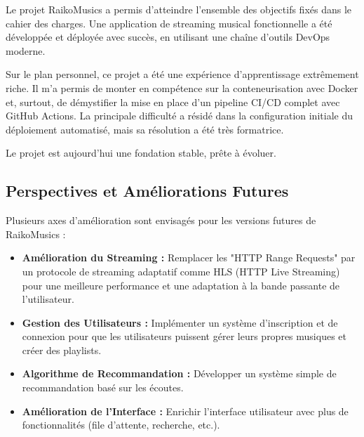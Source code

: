 \documentclass[12pt,a4paper]{article} %
\begin{document}
Le projet RaikoMusics a permis d'atteindre l'ensemble des objectifs fixés dans le cahier des charges. Une application de streaming musical fonctionnelle a été développée et déployée avec succès, en utilisant une chaîne d'outils DevOps moderne.

Sur le plan personnel, ce projet a été une expérience d'apprentissage extrêmement riche. Il m'a permis de monter en compétence sur la conteneurisation avec Docker et, surtout, de démystifier la mise en place d'un pipeline CI/CD complet avec GitHub Actions. La principale difficulté a résidé dans la configuration initiale du déploiement automatisé, mais sa résolution a été très formatrice.

Le projet est aujourd'hui une fondation stable, prête à évoluer.

\subsection{Perspectives et Améliorations Futures}
Plusieurs axes d'amélioration sont envisagés pour les versions futures de RaikoMusics :
\begin{itemize}
    \item \textbf{Amélioration du Streaming :} Remplacer les "HTTP Range Requests" par un protocole de streaming adaptatif comme HLS (HTTP Live Streaming) pour une meilleure performance et une adaptation à la bande passante de l'utilisateur.
    \item \textbf{Gestion des Utilisateurs :} Implémenter un système d'inscription et de connexion pour que les utilisateurs puissent gérer leurs propres musiques et créer des playlists.
    \item \textbf{Algorithme de Recommandation :} Développer un système simple de recommandation basé sur les écoutes.
    \item \textbf{Amélioration de l'Interface :} Enrichir l'interface utilisateur avec plus de fonctionnalités (file d'attente, recherche, etc.).
\end{itemize}
\end{document}
